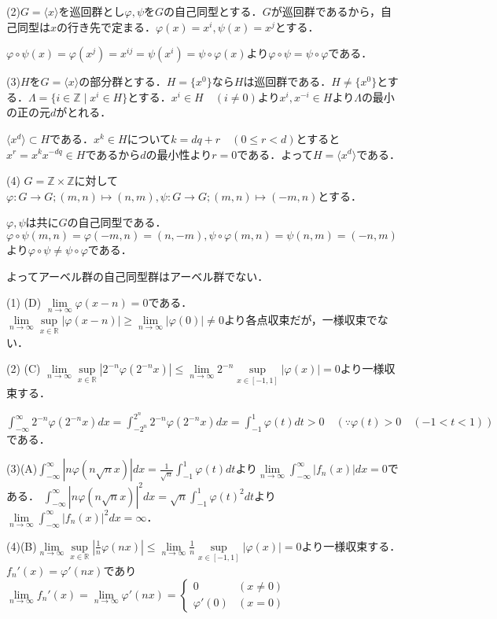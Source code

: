\documentclass[
		book,
		head_space=20mm,
		foot_space=20mm,
		gutter=10mm,
		line_length=190mm
]{jlreq}
\begin{document}
(2)$G=\langle x \rangle$を巡回群とし$\varphi,\psi$を$G$の自己同型とする．$G$が巡回群であるから，自己同型は$x$の行き先で定まる．$\varphi(x)=x^i,\psi(x)=x^j$とする．

$\varphi \circ \psi(x)=\varphi(x^j)=x^{ij} = \psi(x^i)=\psi \circ \varphi(x)$より$\varphi \circ \psi = \psi \circ \varphi$である．

(3)$H$を$G=\langle x \rangle$の部分群とする．$H = \{ x^0 \}$なら$H$は巡回群である．$H \neq \{ x^0 \}$とする．$\Lambda = \{i\in \mathbb{Z} \mid x^i \in H\}$とする．$x^i \in H\quad(i\neq 0)$より$x^i,x^{-i}\in H$より$\Lambda$の最小の正の元$d$がとれる．

$\langle x^d \rangle \subset H$である．$x^k \in H $について$k=dq+r\quad(0\leq r < d)$とすると$x^r = x^k x^{-dq} \in H$であるから$d$の最小性より$r=0$である．よって$H = \langle x^d \rangle$である．

(4) $G = \mathbb{Z} \times \mathbb{Z} $に対して$\varphi\colon G \rightarrow G; (m,n) \mapsto (n,m),\psi \colon G \rightarrow G; (m,n) \mapsto (-m,n)$とする．

$\varphi,\psi$は共に$G$の自己同型である．$\varphi \circ \psi(m,n) = \varphi(-m,n) = (n,-m),\psi \circ \varphi(m,n) = \psi(n,m) = (-n,m)$より$\varphi \circ \psi \neq \psi \circ \varphi$である．

よってアーベル群の自己同型群はアーベル群でない．

(1) (D)
$\lim\limits_{n \to \infty} \varphi(x-n)=0$である．
$\lim\limits_{n \to \infty} \sup\limits_{x\in \mathbb{R}} |\varphi(x-n)| \ge \lim\limits_{n \to \infty} |\varphi(0)| \neq 0$より各点収束だが，一様収束でない．

(2) (C)
$\lim\limits_{n \to \infty} \sup\limits_{x\in \mathbb{R}} |2^{-n} \varphi(2^{-n}x)|\le \lim\limits_{n \to \infty} 2^{-n} \sup\limits_{x\in [-1,1]} |\varphi(x)| = 0$より一様収束する．

$\int_{-\infty}^{\infty} 2^{-n}\varphi(2^{-n}x)dx = \int_{-2^n}^{2^n} 2^{-n}\varphi(2^{-n}x)dx = \int_{-1}^{1} \varphi(t)dt >0 \quad(\because \varphi(t) >0 \quad(-1<t<1))$である．

(3)(A)$\int_{-\infty}^{\infty} |n\varphi(n\sqrt{n}x)|dx = \frac{1}{\sqrt{n}}\int_{-1}^1 \varphi(t)dt$より$\lim\limits_{n\to \infty} \int_{-\infty}^{\infty} |f_n(x)|dx =0$である．
$\int_{-\infty}^{\infty} |n\varphi(n\sqrt{n}x)|^2dx = \sqrt{n}\int_{-1}^1 \varphi(t)^2dt$より$\lim\limits_{n\to \infty} \int_{-\infty}^{\infty} |f_n(x)|^2dx = \infty$．

(4)(B)$\lim\limits_{n\to \infty}\sup\limits_{x\in \mathbb{R}}|\frac{1}{n}\varphi(nx)| \le \lim\limits_{n\to \infty}\frac{1}{n}\sup\limits_{x\in [-1,1]}|\varphi(x)| = 0$より一様収束する．
$f_n'(x)=\varphi'(nx)$であり$\lim\limits_{n \to \infty}f_n'(x)=\lim\limits_{n \to \infty}\varphi'(nx)=\begin{cases}
    0 & (x\neq 0) \\
    \varphi'(0) & (x=0)
\end{cases}$
\end{document}
